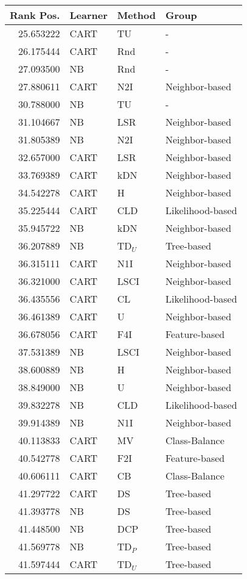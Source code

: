 \begin{tabular}{rlll}
\toprule
Rank Pos. & Learner & Method & Group \\
\midrule
25.653222 & CART & TU & - \\
26.175444 & CART & Rnd & - \\
27.093500 & NB & Rnd & - \\
27.880611 & CART & N2I & Neighbor-based \\
30.788000 & NB & TU & - \\
31.104667 & NB & LSR & Neighbor-based \\
31.805389 & NB & N2I & Neighbor-based \\
32.657000 & CART & LSR & Neighbor-based \\
33.769389 & CART & kDN & Neighbor-based \\
34.542278 & CART & H & Neighbor-based \\
35.225444 & CART & CLD & Likelihood-based \\
35.945722 & NB & kDN & Neighbor-based \\
36.207889 & NB & TD$_U$ & Tree-based \\
36.315111 & CART & N1I & Neighbor-based \\
36.321000 & CART & LSCI & Neighbor-based \\
36.435556 & CART & CL & Likelihood-based \\
36.461389 & CART & U & Neighbor-based \\
36.678056 & CART & F4I & Feature-based \\
37.531389 & NB & LSCI & Neighbor-based \\
38.600889 & NB & H & Neighbor-based \\
38.849000 & NB & U & Neighbor-based \\
39.832278 & NB & CLD & Likelihood-based \\
39.914389 & NB & N1I & Neighbor-based \\
40.113833 & CART & MV & Class-Balance \\
40.542778 & CART & F2I & Feature-based \\
40.606111 & CART & CB & Class-Balance \\
41.297722 & CART & DS & Tree-based \\
41.393778 & NB & DS & Tree-based \\
41.448500 & NB & DCP & Tree-based \\
41.569778 & NB & TD$_P$ & Tree-based \\
41.597444 & CART & TD$_U$ & Tree-based \\

\end{tabular}
